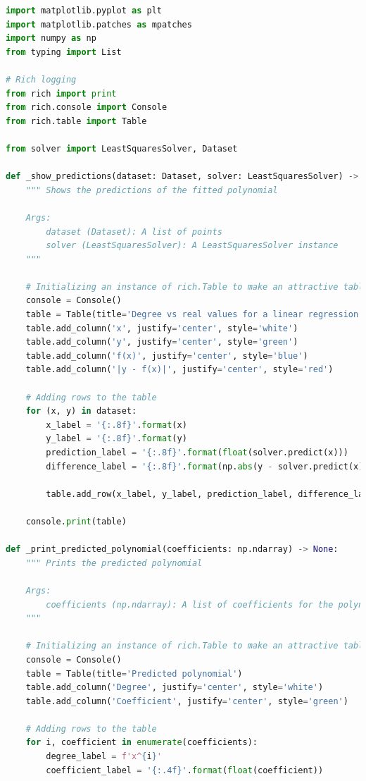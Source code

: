\documentclass[12pt]{extarticle}
\begin{document}
\begin{lstlisting}[language=Python, caption=Запуск методу найближчих квадратів]
import matplotlib.pyplot as plt
import matplotlib.patches as mpatches
import numpy as np
from typing import List

# Rich logging
from rich import print
from rich.console import Console
from rich.table import Table

from solver import LeastSquaresSolver, Dataset

def _show_predictions(dataset: Dataset, solver: LeastSquaresSolver) -> None:
    """ Shows the predictions of the fitted polynomial

    Args:
        dataset (Dataset): A list of points
        solver (LeastSquaresSolver): A LeastSquaresSolver instance
    """
    
    # Initializing an instance of rich.Table to make an attractive table in the console
    console = Console()
    table = Table(title='Degree vs real values for a linear regression')
    table.add_column('x', justify='center', style='white')
    table.add_column('y', justify='center', style='green')
    table.add_column('f(x)', justify='center', style='blue')
    table.add_column('|y - f(x)|', justify='center', style='red')
    
    # Adding rows to the table
    for (x, y) in dataset:
        x_label = '{:.8f}'.format(x)
        y_label = '{:.8f}'.format(y)
        prediction_label = '{:.8f}'.format(float(solver.predict(x)))
        difference_label = '{:.8f}'.format(np.abs(y - solver.predict(x)))
        
        table.add_row(x_label, y_label, prediction_label, difference_label)
    
    console.print(table)

def _print_predicted_polynomial(coefficients: np.ndarray) -> None:
    """ Prints the predicted polynomial
    
    Args:
        coefficients (np.ndarray): A list of coefficients for the polynomial of the given degree (degree + 1)
    """
    
    # Initializing an instance of rich.Table to make an attractive table in the console
    console = Console()
    table = Table(title='Predicted polynomial')
    table.add_column('Degree', justify='center', style='white')
    table.add_column('Coefficient', justify='center', style='green')
    
    # Adding rows to the table
    for i, coefficient in enumerate(coefficients):
        degree_label = f'x^{i}'
        coefficient_label = '{:.4f}'.format(float(coefficient))
        

\end{lstlisting}
\end{document}
